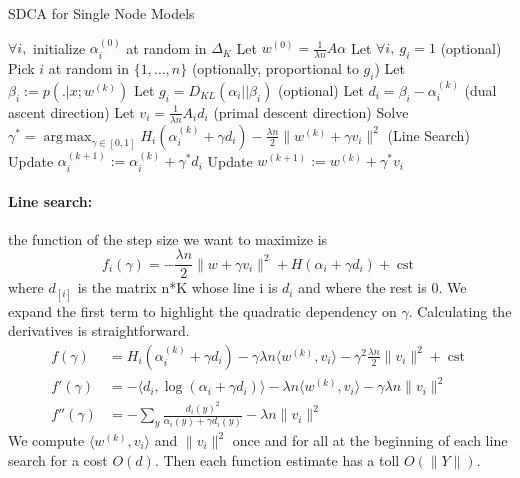 \documentclass{article}
\DeclareMathOperator{\cst}{cst}
\DeclareMathOperator{\1}{\mathbb{1}}
\DeclareMathOperator*{\argmax}{arg\,max}
\begin{document}
\begin{algorithm}[ht]
    \caption{SDCA for Single Node Models}%
    \label{sdca for logreg}
\begin{algorithmic}
        \STATE $\forall i,$ initialize $\alpha_i^{(0)}$ at random in $\Delta_K$
        \STATE Let $w^{(0)} = \frac{1}{\lambda n} A \alpha$  
        \STATE Let $\forall i,\  g_i = 1$ (optional)
                \STATE Pick $i$ at random in $\{1,\ldots,n\}$ (optionally, proportional to $g_i$)
                \STATE Let $ \beta_i := p( . |x ; w^{(k)})$
                \STATE Let $g_i = D_{KL}(\alpha_i || \beta_i)$ (optional)
                \STATE Let $d_i = \beta_i - \alpha_i^{(k)}$ (dual ascent direction)
                \STATE Let $v_i = \frac{1}{\lambda n} A_i d_i $ (primal descent direction)
                \STATE Solve $\gamma^* = \argmax_{\gamma \in [0,1]} H_i(\alpha_i^{(k)} + \gamma d_i) - \frac{\lambda n}{2} \| w^{(k)} + \gamma v_i \|^2$ (Line Search)
               \STATE Update $\alpha_i^{(k+1)} := \alpha_i^{(k)} + \gamma^* d_i$
               \STATE Update $w^{(k+1)} := w^{(k)} + \gamma^* v_i $
        \ENDFOR
\end{algorithmic}
\end{algorithm}


\paragraph{Line search:} 
the function of the step size we want to maximize is 
\begin{equation*}
	\label{line search 1}
	f_i(\gamma) = -\frac{\lambda n}{2} \|w + \gamma v_i\|^2 + H(\alpha_i + \gamma d_i) + \cst
\end{equation*}
where $d_{[i]}$ is the matrix n*K whose line i is $d_i$ and where the rest is 0.
We expand the first term to highlight the quadratic dependency on $\gamma$.
Calculating the derivatives is straightforward.
\begin{align*}
	f(\gamma)
	& = H_i(\alpha_i^{(k)} + \gamma d_i)
	- \gamma \lambda n  \langle w^{(k)} , v_i \rangle 
	- \gamma^2 \frac{\lambda n}{2} \|v_i \|^2
	+ \cst
	\\
	f'(\gamma) & =  - \langle d_i, \log(\alpha_i + \gamma d_i) \rangle
	- \lambda n \langle w^{(k)} , v_i \rangle 
	- \gamma \lambda n \|v_i \|^2 
	\\
	f''(\gamma) & = - \sum_{y} \frac{d_{i}(y)^2 }{ \alpha_i(y) + \gamma d_i(y) }
	- \lambda n  \|v_i \|^2 
\end{align*}
We compute $\langle w^{(k)} , v_i \rangle$ and $ \|v_i \|^2$ once and for all at the beginning of each line search for a cost $O(d)$. Then each function estimate has a toll $O(\|Y\|)$.
\end{document}
